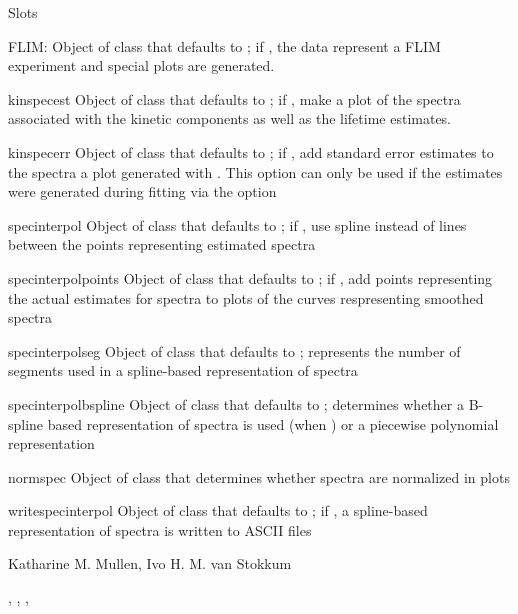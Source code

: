 \begin{Section}{Slots}
{\item[FLIM:] Object of class  that defaults to 
; if , the data represent a FLIM experiment and 
special plots are generated. 
\item[kinspecest] Object of class  that defaults to 
; if , make a plot of the spectra associated with
the kinetic components as well as the lifetime estimates. 
\item[kinspecerr] Object of class  that defaults to 
; if , add standard error estimates to the spectra
a plot generated with .  This option can only be 
used if the estimates were generated during fitting via the option 
\item[specinterpol] Object of class  that defaults to 
; if , use spline instead of lines between 
the points representing estimated spectra
\item[specinterpolpoints] Object of class  that defaults to 
; if , add points representing the actual estimates
for spectra to plots of the curves respresenting smoothed spectra
\item[specinterpolseg] Object of class  that defaults to 
; represents the number of segments used in a spline-based
representation of spectra  
\item[specinterpolbspline] Object of class  that defaults
to ; determines whether a B-spline based representation of
spectra is used (when ) or a piecewise polynomial 
representation 
\item[normspec] Object of class  that determines whether
spectra are normalized in plots

\item[writespecinterpol] Object of class  that defaults to 
; if , a spline-based representation of spectra
is written to ASCII files
}
\end{Section}
\begin{Author}\relax
Katharine M. Mullen, Ivo H. M. van Stokkum
\end{Author}
\begin{SeeAlso}\relax
{}, , , 
\end{SeeAlso}

